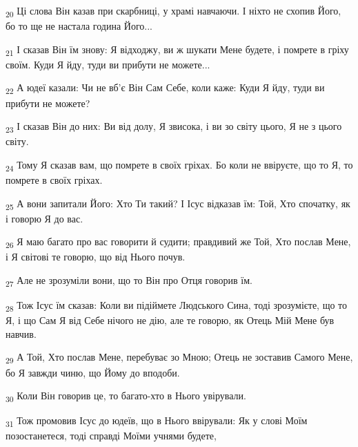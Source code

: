 \begin{tcolorbox}
\textsubscript{20} Ці слова Він казав при скарбниці, у храмі навчаючи. І ніхто не схопив Його, бо то ще не настала година Його...
\end{tcolorbox}
\begin{tcolorbox}
\textsubscript{21} І сказав Він їм знову: Я відходжу, ви ж шукати Мене будете, і помрете в гріху своїм. Куди Я йду, туди ви прибути не можете...
\end{tcolorbox}
\begin{tcolorbox}
\textsubscript{22} А юдеї казали: Чи не вб'є Він Сам Себе, коли каже: Куди Я йду, туди ви прибути не можете?
\end{tcolorbox}
\begin{tcolorbox}
\textsubscript{23} І сказав Він до них: Ви від долу, Я звисока, і ви зо світу цього, Я не з цього світу.
\end{tcolorbox}
\begin{tcolorbox}
\textsubscript{24} Тому Я сказав вам, що помрете в своїх гріхах. Бо коли не ввіруєте, що то Я, то помрете в своїх гріхах.
\end{tcolorbox}
\begin{tcolorbox}
\textsubscript{25} А вони запитали Його: Хто Ти такий? І Ісус відказав їм: Той, Хто спочатку, як і говорю Я до вас.
\end{tcolorbox}
\begin{tcolorbox}
\textsubscript{26} Я маю багато про вас говорити й судити; правдивий же Той, Хто послав Мене, і Я світові те говорю, що від Нього почув.
\end{tcolorbox}
\begin{tcolorbox}
\textsubscript{27} Але не зрозуміли вони, що то Він про Отця говорив їм.
\end{tcolorbox}
\begin{tcolorbox}
\textsubscript{28} Тож Ісус їм сказав: Коли ви підіймете Людського Сина, тоді зрозумієте, що то Я, і що Сам Я від Себе нічого не дію, але те говорю, як Отець Мій Мене був навчив.
\end{tcolorbox}
\begin{tcolorbox}
\textsubscript{29} А Той, Хто послав Мене, перебуває зо Мною; Отець не зоставив Самого Мене, бо Я завжди чиню, що Йому до вподоби.
\end{tcolorbox}
\begin{tcolorbox}
\textsubscript{30} Коли Він говорив це, то багато-хто в Нього увірували.
\end{tcolorbox}
\begin{tcolorbox}
\textsubscript{31} Тож промовив Ісус до юдеїв, що в Нього ввірували: Як у слові Моїм позостанетеся, тоді справді Моїми учнями будете,
\end{tcolorbox}
